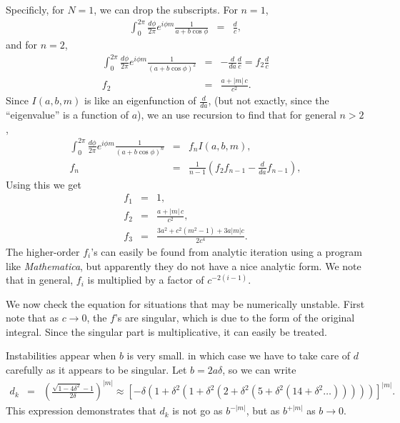\documentclass[aps,prc,preprint,tightenlines]{revtex4}
\begin{document}
Specificly, for $N=1$, we can drop the subscripts.  For $n=1$,
\begin{eqnarray}
\int_0^{2\pi} \frac{d\phi}{2\pi} e^{i \phi m} 
\frac{1}{a + b \cos\phi}
&=& \frac{d}{c},
\end{eqnarray}
and for $n=2$,
\begin{eqnarray}
\int_0^{2\pi} \frac{d\phi}{2\pi} e^{i \phi m} 
\frac{1}{(a + b \cos\phi)^2}
&=& - \frac{d}{d a} \frac{d}{c}
= f_2 \frac{d}{c} \\
f_2 &=& \frac{a+|m| \, c}{c^2}.
\end{eqnarray}
Since $I(a,b,m)$ is like an eigenfunction of $\frac{d}{da}$, (but not
exactly, since the ``eigenvalue'' is a function of $a$), we an use
recursion to find that for general $n>2$,
\begin{eqnarray}
\int_0^{2\pi} \frac{d\phi}{2\pi} e^{i \phi m} 
\frac{1}{(a + b \cos\phi)^n}
&=& f_n I(a,b,m), \\
f_n &=& \frac{1}{n-1}\left( f_2 f_{n-1} - \frac{d}{da} f_{n-1} \right),
\end{eqnarray}
Using this we get
\begin{eqnarray}
f_1 &=& 1, \\
f_2 &=& \frac{a+|m| \, c}{c^2}, \\
f_3 &=& \frac{3 a^2 + c^2(m^2-1)+3a|m|c}{2c^4}.
\end{eqnarray}
The higher-order $f_i$'s can easily be found from analytic iteration
using a program like {\it Mathematica}, but apparently they do not have
a nice analytic form. We note that in general, $f_i$ is multiplied by a
factor of $c^{-2(i-1)}$.

We now check the equation for situations that may be numerically
unstable. First note that as $c\rightarrow0$, the $f$'s are singular,
which is due to the form of the original integral. Since the singular
part is multiplicative, it can easily be treated.

Instabilities appear when $b$ is very small. in which case we have to
take care of $d$ carefully as it appears to be singular. Let
$b=2a\delta$, so we can write
\begin{eqnarray*}
d_k &=& \left(\frac{\sqrt{1-4\delta^2}-1}{2\delta}\right)^{|m|} 
\approx \left[
-\delta
 ( 1 + \delta^2
 ( 1 + \delta^2
 ( 2 + \delta^2
 ( 5 + \delta^2
 (14 + \delta^2 \ldots ))))) \right]^{|m|}.
\end{eqnarray*}
This expression demonstrates that $d_k$ is not go as $b^{-|m|}$, but as
$b^{+|m|}$ as $b\rightarrow0$.
\end{document}
